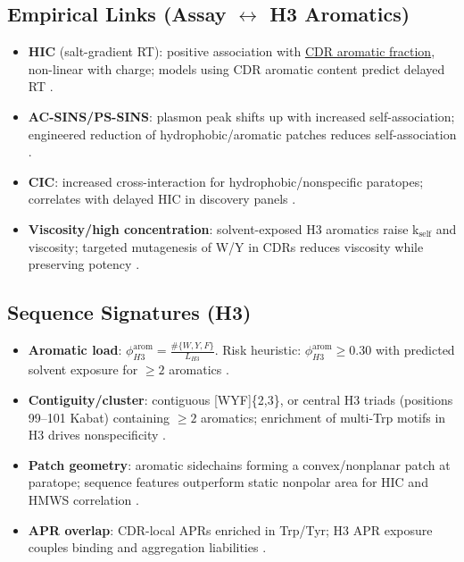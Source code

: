 \subsection*{Empirical Links (Assay $\leftrightarrow$ H3 Aromatics)}
\begin{itemize}
  \item \textbf{HIC} (salt-gradient RT): positive association with \underline{CDR aromatic fraction}, non-linear with charge; models using CDR aromatic content predict delayed RT \cite{Hebditch2019,Jain2017}.
  \item \textbf{AC-SINS/PS-SINS}: plasmon peak shifts up with increased self-association; engineered reduction of hydrophobic/aromatic patches reduces self-association \cite{Phan2022,Geoghegan2016}.
  \item \textbf{CIC}: increased cross-interaction for hydrophobic/nonspecific paratopes; correlates with delayed HIC in discovery panels \cite{Kohli2015,Jain2017}.
  \item \textbf{Viscosity/high concentration}: solvent-exposed H3 aromatics raise k$_\text{self}$ and viscosity; targeted mutagenesis of W/Y in CDRs reduces viscosity while preserving potency \cite{Park2024,Dai2024,Geoghegan2016}.
\end{itemize}

\subsection*{Sequence Signatures (H3)}
\begin{itemize}
  \item \textbf{Aromatic load}: $\phi_{H3}^{\text{arom}}=\frac{\#\{W,Y,F\}}{L_{H3}}$. Risk heuristic: $\phi_{H3}^{\text{arom}}\ge 0.30$ with predicted solvent exposure for $\ge 2$ aromatics \cite{Hebditch2019,Jain2017,Park2024}.
  \item \textbf{Contiguity/cluster}: contiguous [WYF]\{2,3\}, or central H3 triads (positions 99–101 Kabat) containing $\ge 2$ aromatics; enrichment of multi-Trp motifs in H3 drives nonspecificity \cite{Kelly2017}.
  \item \textbf{Patch geometry}: aromatic sidechains forming a convex/nonplanar patch at paratope; sequence features outperform static nonpolar area for HIC and HMWS correlation \cite{Hebditch2019}.
  \item \textbf{APR overlap}: CDR-local APRs enriched in Trp/Tyr; H3 APR exposure couples binding and aggregation liabilities \cite{Wang2010}.
\end{itemize}

